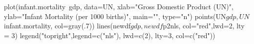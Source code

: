 \begin{Schunk}
\begin{Sinput}
 plot(infant.mortality~gdp, data=UN, xlab="Gross Domestic Product (UN)", ylab="Infant Mortality (per 1000 births)", main="", type="n")
 points(UN$gdp, UN$infant.mortality, col=gray(.7))
 lines(newdf$gdp, newdf$p2nls, col="red",lwd=2, lty = 3)
 legend("topright",legend=c("nls"), lwd=c(2), lty=3, col=c("red"))
\end{Sinput}
\end{Schunk}
